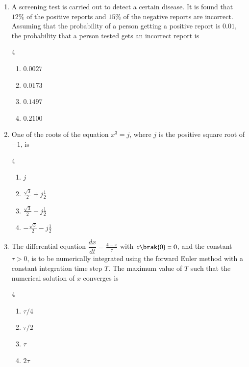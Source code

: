 \documentclass[journal,12pt,onecolumn]{IEEEtran}
\theoremstyle{remark}
\begin{document}
\begin{enumerate}
\vspace{0.5cm}
\item A screening test is carried out to detect a certain disease. It is found that $12\%$ of the positive reports and $15\%$ of the negative reports are incorrect. Assuming that the probability of a person getting a positive report is $0.01$, the probability that a person tested gets an incorrect report is \par \hfill{}
\begin{multicols}{4}
    \begin{enumerate}
        \item $0.0027$
        \item $0.0173$
        \item $0.1497$
        \item $0.2100$
\end{enumerate}
\end{multicols}

\vspace{0.5cm}
\item One of the roots of the equation $x^3=j$, where $j$ is the positive square root of $-1$, is \par \hfill{}
\begin{multicols}{4}
    \begin{enumerate}
        \item $j$
        \item $\frac{\sqrt3}{2}+j\frac{1}{2}$
        \item $\frac{\sqrt3}{2}-j\frac{1}{2}$
        \item $-\frac{\sqrt3}{2}-j\frac{1}{2}$
\end{enumerate}
\end{multicols}

\vspace{0.5cm}
\item The differential equation $\dfrac{dx}{dt}=\frac{4-x}{\tau}$ with $x\brak{0}=0$, and the constant $\tau>0$, is to be numerically integrated using the forward Euler method with a constant integration time step $T$. The maximum value of $T$ such that the numerical solution of $x$ converges is \hfill{}
\begin{multicols}{4}
    \begin{enumerate}
        \item ${\tau}/{4}$
        \item $\tau/2$
        \item $\tau$
        \item $2\tau$
\end{enumerate}
\end{multicols}


\end{enumerate}
\end{document}
